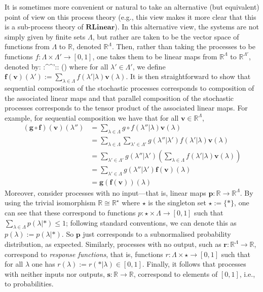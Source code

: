\documentclass[onecolum,aps,groupedaddress,nofootinbib]{revtex4-2}
\newcommand\RL{\mathbf{RLinear}}
\begin{document}
It is sometimes more convenient or natural to take an alternative (but equivalent) point of view on this process theory (e.g., this view makes it more clear that this is a sub-process theory of $\RL$). In this alternative view, the systems are not simply given by finite sets $\Lambda$, but rather are taken to be the vector space of functions from $\Lambda$ to $\mathds{R}$, denoted $\mathds{R}^\Lambda$. Then, rather than taking the processes to be functions $f:\Lambda\times \Lambda'\to[0,1]$, one takes them to be linear maps from $\mathds{R}^\Lambda$ to $\mathds{R}^{\Lambda'}$, denoted by:
\beq
{}:^\Lambda \to {}^{\Lambda'}:: \mapsto {}()
\eeq
where for all $\lambda'\in\Lambda'$, we define
$\mathbf{f(v)}(\lambda') := \sum_{\lambda\in\Lambda} f(\lambda'|\lambda)\mathbf{v}(\lambda)$. It is then straightforward to show that sequential composition of the stochastic processes corresponds to composition of the associated linear maps and that parallel composition of the stochastic processes corresponds to the tensor product of the associated linear maps. For example, for sequential composition we have that for all $\mathbf{v}\in\mathds{R}^\Lambda$,
\begin{align}
\mathbf{(g\circ f)(v)}(\lambda'') &= \sum_{\lambda\in\Lambda}g\circ f(\lambda''|\lambda)\mathbf{v}(\lambda) \\
&= \sum_{\lambda\in\Lambda}\sum_{\lambda'\in\Lambda'}g(\lambda''|\lambda')f(\lambda'|\lambda)\mathbf{v}(\lambda)\\
&= \sum_{\lambda'\in\Lambda'}g(\lambda''|\lambda')\left(\sum_{\lambda\in\Lambda}f(\lambda'|\lambda)\mathbf{v}(\lambda)\right)\\
&= \sum_{\lambda'\in\Lambda}g(\lambda''|\lambda')\mathbf{f(v)}(\lambda)\\
&= \mathbf{g(f(v))}(\lambda)
\end{align}
Moreover, consider processes with no input---that is, linear maps $\mathbf{p}:\mathds{R}\to\mathds{R}^\Lambda$. By using the trivial isomorphism $\mathds{R}\cong \mathds{R}^\star$ where $\star$ is the singleton set $\star:=\{*\}$, one can see that these correspond to functions $p:\star\times\Lambda\to[0,1]$ such that $\sum_{\lambda\in\Lambda}p(\lambda|*)\leq 1$; following standard conventions, we can denote this as $p(\lambda):= p(\lambda|*)$. So $\mathbf{p}$ just corresponds to a subnormalised probability distribution, as expected. Similarly, processes with no output, such as $\mathbf{r}:\mathds{R}^\Lambda\to\mathds{R}$,  correspond to \emph{response functions}, that is, functions $r:\Lambda\times\star\to[0,1]$ such that for all $\lambda$ one has $r(\lambda):=r(*|\lambda) \in [0,1]$. Finally, it follows that processes with neither inputs nor outputs, $\mathbf{s}:\mathds{R}\to\mathds{R}$, correspond to elements of $[0,1]$, i.e., to probabilities.
\end{document}
